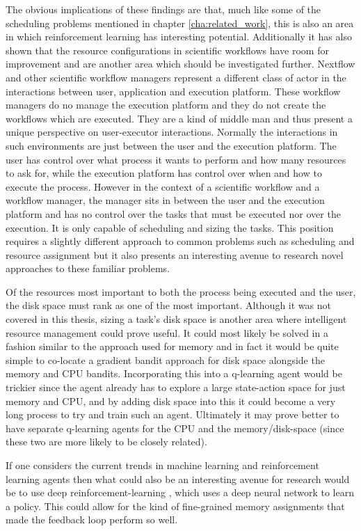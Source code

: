 The obvious implications of these findings are that, much like some of the scheduling problems mentioned in chapter \ref{cha:related_work}, this is also an area in which reinforcement learning has interesting potential. Additionally it has also shown that the resource configurations in scientific workflows have room for improvement and are another area which should be investigated further. Nextflow and other scientific workflow managers represent a different class of actor in the interactions between user, application and execution platform. These workflow managers do no manage the execution platform and they do not create the workflows which are executed. They are a kind of middle man and thus present a unique perspective on user-executor interactions. Normally the interactions in such environments are just between the user and the execution platform. The user has control over what process it wants to perform and how many resources to ask for, while the execution platform has control over when and how to execute the process. However in the context of a scientific workflow and a workflow manager, the manager sits in between the user and the execution platform and has no control over the tasks that must be executed nor over the execution. It is only capable of scheduling and sizing the tasks. This position requires a slightly different approach to common problems such as scheduling and resource assignment but it also presents an interesting avenue to research novel approaches to these familiar problems.

Of the resources most important to both the process being executed and the user, the disk space must rank as one of the most important. Although it was not covered in this thesis, sizing a task’s disk space is another area where intelligent resource management could prove useful. It could most likely be solved in a fashion similar to the approach used for memory and in fact it would be quite simple to co-locate a gradient bandit approach for disk space alongside the memory and CPU bandits. Incorporating this into a q-learning agent would be trickier since the agent already has to explore a large state-action space for just memory and CPU, and by adding disk space into this it could become a very long process to try and train such an agent. Ultimately it may prove better to have separate q-learning agents for the CPU and the memory/disk-space (since these two are more likely to be closely related).

If one considers the current trends in machine learning and reinforcement learning agents then what could also be an interesting avenue for research would be to use deep reinforcement-learning \cite{deepQ}, which uses a deep neural network to learn a policy. This could allow for the kind of fine-grained memory assignments that made the feedback loop perform so well.


